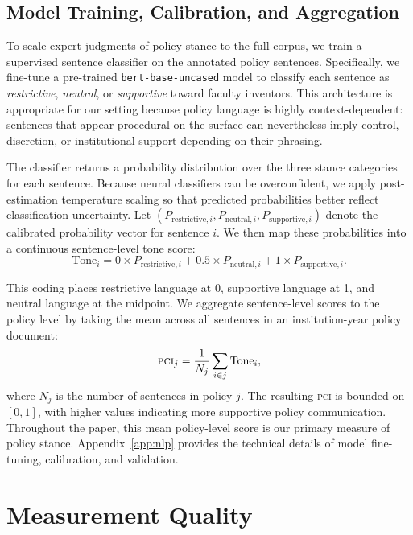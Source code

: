 \documentclass[12pt]{article}
\newcommand{\PCI}{\textsc{pci}}
\begin{document}
\subsection{Model Training, Calibration, and Aggregation}

To scale expert judgments of policy stance to the full corpus, we train a supervised
sentence classifier on the annotated policy sentences. Specifically, we fine-tune a
pre-trained \texttt{bert-base-uncased} model \citep{Devlin2019} to classify each
sentence as \textit{restrictive}, \textit{neutral}, or \textit{supportive} toward
faculty inventors. This architecture is appropriate for our setting because policy
language is highly context-dependent: sentences that appear procedural on the surface
can nevertheless imply control, discretion, or institutional support depending on
their phrasing.

The classifier returns a probability distribution over the three stance categories
for each sentence. Because neural classifiers can be overconfident, we apply
post-estimation temperature scaling so that predicted probabilities better reflect
classification uncertainty. Let
$\left(P_{\text{restrictive},i}, P_{\text{neutral},i}, P_{\text{supportive},i}\right)$
denote the calibrated probability vector for sentence $i$. We then map these
probabilities into a continuous sentence-level tone score:
\[
\text{Tone}_i
= 0 \times P_{\text{restrictive},i}
+ 0.5 \times P_{\text{neutral},i}
+ 1 \times P_{\text{supportive},i}.
\]

This coding places restrictive language at 0, supportive language at 1, and neutral
language at the midpoint. We aggregate sentence-level scores to the policy level by
taking the mean across all sentences in an institution-year policy document:
\[
\PCI_j = \frac{1}{N_j}\sum_{i \in j} \text{Tone}_i,
\]
where $N_j$ is the number of sentences in policy $j$. The resulting \PCI{} is bounded
on $[0,1]$, with higher values indicating more supportive policy communication.
Throughout the paper, this mean policy-level score is our primary measure of policy
stance. Appendix~\ref{app:nlp} provides the technical details of model fine-tuning,
calibration, and validation.

\section{Measurement Quality}
\label{sec:validity}
\end{document}
